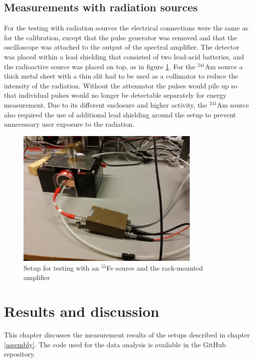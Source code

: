 \documentclass[a4paper]{article}
\begin{document}
\subsection{Measurements with radiation sources}
\label{setup_testing}
For the testing with radiation sources the electrical connections were the same as for the calibration, except that the pulse generator was removed and that the oscilloscope was attached to the output of the spectral amplifier.
The detector was placed within a lead shielding that consisted of two lead-acid batteries, and the radioactive source was placed on top, as in figure \ref{fig:setup_testing}.
For the $^{241}$Am source a thick metal sheet with a thin slit had to be used as a collimator to reduce the intensity of the radiation.
Without the attenuator the pulses would pile up so that individual pulses would no longer be detectable separately for energy measurement.
Due to its different enclosure and higher activity, the $^{241}$Am source also required the use of additional lead shielding around the setup to prevent unnecessary user exposure to the radiation.

\begin{figure}[ht!]
\centering
\includegraphics[width=0.8\textwidth]{fig/IMG_20201130_144418.jpg}
\caption{Setup for testing with an $^{55}$Fe source and the rack-mounted amplifier}
\label{fig:setup_testing}
\end{figure}



\clearpage
\section{Results and discussion}
\label{results}
This chapter discusses the measurement results of the setups described in chapter \ref{assembly}.
The code used for the data analysis is available in the GitHub repository. \cite{repo}
\end{document}
